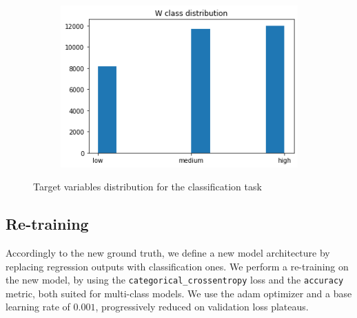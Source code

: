 \begin{figure}[!h]
\begin{center}
\begin{subfigure}[h]{0.24\textwidth}
		\end{subfigure}
		\hfill
		\begin{subfigure}[h]{0.24\textwidth}
			\centering
			\includegraphics[width=1\textwidth]{"contents/images/distributions/w-class"}
		\end{subfigure}
	\end{center}
	\vspace{-0.5cm}
	\caption[Target variables distribution for the classification task]{Target variables distribution for the classification task}
	\label{fig:proximitynet-dataset-distribution-class}
\end{figure}



\subsection{Re-training}
\label{subsec:gradcam-retrain}

Accordingly to the new ground truth, we define a new model architecture by replacing regression outputs with classification ones. 
We perform a re-training on the new model, by using the \texttt{categorical\_crossentropy} loss and the \texttt{accuracy} metric, both suited for multi-class models. We use the \gls{adam} optimizer and a base learning rate of $0.001$, progressively reduced on validation loss plateaus. 

